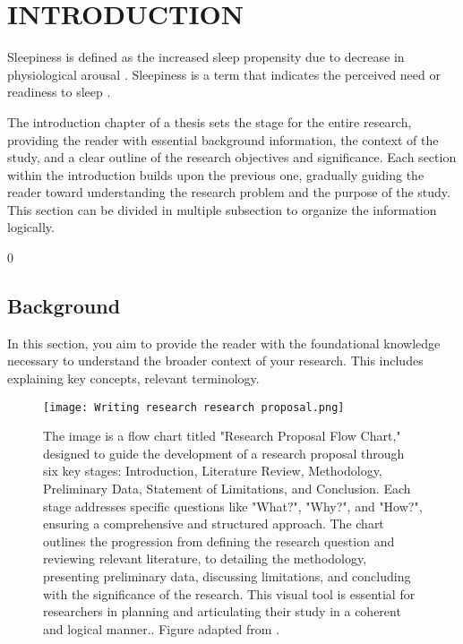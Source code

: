 \chapter{INTRODUCTION}



Sleepiness is defined as the increased sleep propensity due to decrease in physiological arousal \parencite{Lal_2005as, Vassalli2009}. 	Sleepiness is a term that indicates the perceived need or readiness to sleep  \parencite{Amso_2015}.


The introduction chapter of a thesis sets the stage for the entire research, providing the reader with essential background information, the context of the study, and a clear outline of the research objectives and significance. Each section within the introduction builds upon the previous one, gradually guiding the reader toward understanding the research problem and the purpose of the study. This section can be divided in multiple subsection to organize the information logically.

0\section{Background}

In this section, you aim to provide the reader with the foundational knowledge necessary to understand the broader context of your research. This includes explaining key concepts, relevant terminology.


\begin{figure}
	\centering
	\texttt{[image: Writing research research proposal.png]}
	\caption[Research Proposal Flow Chart]
	{The image is a flow chart titled "Research Proposal Flow Chart," designed to guide the development of a research proposal through six key stages: Introduction, Literature Review, Methodology, Preliminary Data, Statement of Limitations, and Conclusion. Each stage addresses specific questions like "What?", "Why?", and "How?", ensuring a comprehensive and structured approach. The chart outlines the progression from defining the research question and reviewing relevant literature, to detailing the methodology, presenting preliminary data, discussing limitations, and concluding with the significance of the research. This visual tool is essential for researchers in planning and articulating their study in a coherent and logical manner.. Figure adapted from \cite{Dorsett2010}.}
	\label{fig:ExxonSpreading}
\end{figure}
%


